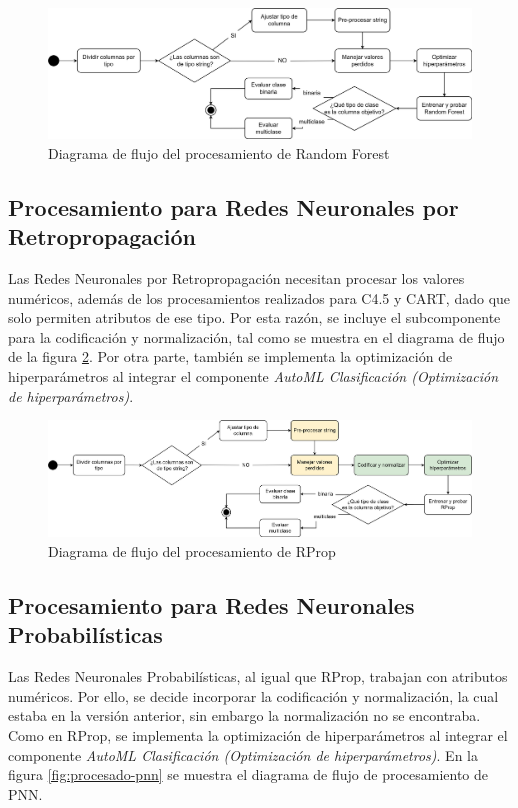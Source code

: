 \begin{figure}[H]
	\centering
	\includegraphics[width=1\linewidth]{"figuras/capi 2/modelos/procesado rf.drawio"}
	\caption{Diagrama de flujo del procesamiento de Random Forest}
	\label{fig:procesado-rf}
\end{figure}


\subsection{Procesamiento para Redes Neuronales por Retropropagación}
Las Redes Neuronales por Retropropagación necesitan procesar los valores numéricos, además de los procesamientos realizados para C4.5 y CART, dado que solo permiten atributos de ese tipo. Por esta razón, se incluye el subcomponente para la codificación y normalización, tal como se muestra en el diagrama de flujo de la figura \ref{fig:procesado-rprop}. Por otra parte, también se implementa la optimización de hiperparámetros al integrar el componente \textit{AutoML Clasificación (Optimización de hiperparámetros)}.

 \begin{figure}[H]
	\centering
	\includegraphics[width=1\linewidth]{"figuras/capi 2/modelos/procesado rprop.drawio"}
	\caption{Diagrama de flujo del procesamiento de RProp}
	\label{fig:procesado-rprop}
\end{figure}



\subsection{Procesamiento para Redes Neuronales Probabilísticas}
Las Redes Neuronales Probabilísticas, al igual que RProp, trabajan con atributos numéricos. Por ello, se decide incorporar la codificación y normalización, la cual estaba en la versión anterior, sin embargo la normalización no se encontraba. Como en RProp, se implementa la optimización de hiperparámetros al integrar el componente \textit{AutoML Clasificación (Optimización de hiperparámetros)}. En la figura \ref{fig:procesado-pnn} se muestra el diagrama de flujo de procesamiento de PNN.

